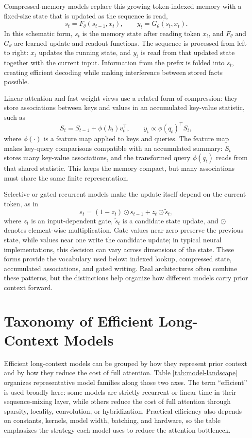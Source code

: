 \documentclass[10pt]{article}
\begin{document}
Compressed-memory models replace this growing token-indexed memory with a
fixed-size state that is updated as the sequence is read,
\[
s_t = F_\theta(s_{t-1},x_t),\qquad y_t = G_\theta(s_t,x_t).
\]
In this schematic form, \(s_t\) is the memory state after reading token \(x_t\),
and \(F_\theta\) and \(G_\theta\) are learned update and readout functions. The
sequence is processed from left to right: \(x_t\) updates the running state, and
\(y_t\) is read from that updated state together with the current input.
Information from the prefix is folded into \(s_t\), creating efficient decoding
while making interference between stored facts possible.

Linear-attention and fast-weight views use a related form of compression: they
store associations between keys and values in an accumulated key-value
statistic, such as
\[
S_t = S_{t-1}+\phi(k_t)v_t^\top,\qquad
y_t \propto \phi(q_t)^\top S_t,
\]
where \(\phi(\cdot)\) is a feature map applied to keys and queries. The feature
map makes key-query comparisons compatible with an accumulated summary:
\(S_t\) stores many key-value associations, and the transformed query
\(\phi(q_t)\) reads from that shared statistic. This keeps the memory compact,
but many associations must share the same finite representation.

Selective or gated recurrent models make the update itself depend on the
current token, as in
\[
s_t=(1-z_t)\odot s_{t-1}+z_t\odot \tilde{s}_t,
\]
where \(z_t\) is an input-dependent gate, \(\tilde{s}_t\) is a candidate
state update, and \(\odot\) denotes element-wise multiplication. Gate values
near zero preserve the previous state, while values near one write the
candidate update; in typical neural implementations, this decision can vary
across dimensions of the state. These forms provide the vocabulary used below:
indexed lookup, compressed state, accumulated associations, and gated writing.
Real architectures often combine these patterns, but the distinctions help
organize how different models carry prior context forward.

\section{Taxonomy of Efficient Long-Context Models}

Efficient long-context models can be grouped by how they represent prior
context and by how they reduce the cost of full attention. Table
\ref{tab:model-landscape} organizes representative model families along those
two axes. The term ``efficient'' is used broadly here: some models are strictly
recurrent or linear-time in their sequence-mixing layer, while others reduce
the cost of full attention through sparsity, locality, convolution, or
hybridization. Practical efficiency also depends on constants, kernels, model
width, batching, and hardware, so the table emphasizes the strategy each model
uses to reduce the attention bottleneck.
\end{document}
